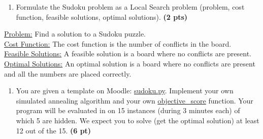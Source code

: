 \documentclass[11pt,a4paper]{report}
\begin{document}
\begin{enumerate}
    \item Formulate the Sudoku problem as a Local Search problem (problem, cost function, feasible solutions, optimal solutions). \textbf{(2 pts)}
\end{enumerate}

\begin{answer}
	\underline{Problem:} Find a solution to a Sudoku puzzle.
	\\
	\underline{Cost Function:} The cost function is the number of conflicts in the board.
	\\
	\underline{Feasible Solutions:} A feasible solution is a board where no conflicts are present.
	\\
	\underline{Optimal Solutions:} An optimal solution is a board where no conflicts are present and all the numbers are placed correctly.
\end{answer}

\begin{enumerate}
    \item You are given a template on Moodle: \url{sudoku.py}. Implement your own simulated annealing algorithm and your own \url{objective\_score} function. Your program will be evaluated in on 15 instances (during 3 minutes each) of which 5 are hidden. We expect you to solve (get the optimal solution) at least 12 out of the 15. \textbf{(6 pt)}
\end{enumerate}

\begin{answer}
\end{answer}
\end{document}
